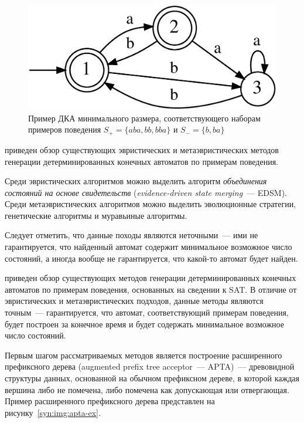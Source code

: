 \begin{figure}[ht]
  \centering
  \includegraphics[scale=0.16]{img/datamod/FIG1.eps}
  \caption{Пример ДКА минимального размера, соответствующего наборам примеров поведения $S_{+} = \{aba, bb, bba\}$ и $S_{-} = \{b, ba\}$}
  \label{syn:img:dfa-ex}
\end{figure}


\insection{\ref{sec:review:heuristic-dfa-inf}} приведен обзор существующих эвристических и метаэвристических методов генерации детерминированных конечных автоматов по примерам поведения. 

Среди эвристических алгоритмов можно выделить алгоритм \emph{объединения состояний на основе свидетельств} (\emph{evidence-driven state merging}~--- EDSM).
Среди метаэвристических алгоритмов можно выделить эволюционные стратегии, генетические алгоритмы и муравьиные алгоритмы.

Следует отметить, что данные походы являются неточными~--- ими не гарантируется, что найденный автомат содержит минимальное возможное число состояний, а иногда вообще не гарантируется, что какой-то автомат будет найден.


\insection{\ref{sec:review:sat-dfa-inf}} приведен обзор существующих методов генерации детерминированных конечных автоматов по примерам поведения, основанных на сведении к SAT. В отличие от эвристических и метаэвристических подходов, данные методы являются точным~--- гарантируется, что автомат, соответствующий примерам поведения, будет построен за конечное время и будет содержать минимальное возможное число состояний.

Первым шагом рассматриваемых методов является построение расширенного префиксного дерева (augmented prefix tree acceptor~--- APTA)~--- древовидной структуры данных, основанной на обычном префиксном дереве, в которой каждая вершина либо не помечена, либо помечена как допускающая или отвергающая. 
Пример расширенного префиксного дерева представлен на рисунку~\ref{syn:img:apta-ex}.


